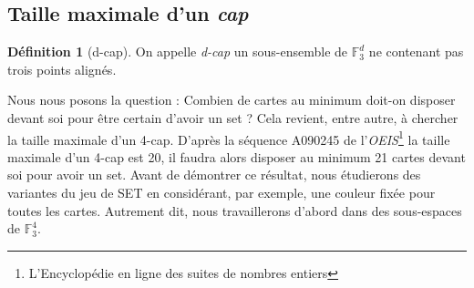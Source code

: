 \documentclass[a4paper,12pt,titlepage]{article}
\theoremstyle{plain}
\theoremstyle{definition}
\newtheorem{defi}{Définition}
\newcommand{\Ftrois}[1]{\mathbb{F}^#1_3}
\begin{document}
\subsection{Taille maximale d'un \emph{cap}}
\begin{defi}[d-cap]
On appelle \emph{d-cap} un sous-ensemble de  $\Ftrois{d}$ ne contenant pas trois points alignés.
\end{defi}
Nous nous posons la question : Combien de cartes au minimum doit-on disposer devant soi pour être certain d'avoir un set ?
Cela revient, entre autre, à chercher la taille maximale d'un 4-cap. D'après la séquence A090245 de l'\emph{OEIS}\footnote{L'Encyclopédie en ligne des suites de nombres entiers} la taille maximale d'un 4-cap est 20, il faudra alors disposer au minimum 21 cartes devant soi pour avoir un set.
Avant de démontrer ce résultat, nous étudierons des variantes du jeu de SET en considérant, par exemple, une couleur fixée pour toutes les cartes. Autrement dit, nous travaillerons d'abord dans des sous-espaces de  $\Ftrois{4}$.
\end{document}

